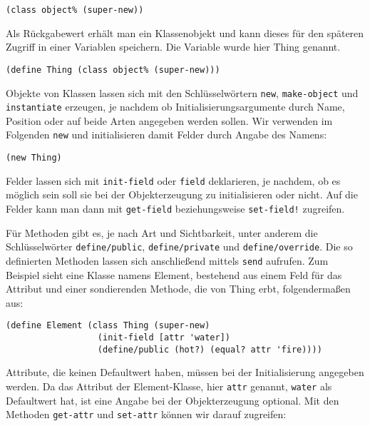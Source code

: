 \begin{lstlisting}
(class object% (super-new))
\end{lstlisting}

Als Rückgabewert erhält man ein Klassenobjekt und kann dieses für den späteren Zugriff in einer Variablen speichern. Die Variable wurde hier Thing genannt.

\begin{lstlisting}
(define Thing (class object% (super-new)))
\end{lstlisting}

Objekte von Klassen lassen sich mit den Schlüsselwörtern \texttt{new}, \texttt{make-object} und \texttt{instantiate} erzeugen, je nachdem ob Initialisierungsargumente durch Name, Position oder auf beide Arten angegeben werden sollen. Wir verwenden im Folgenden \texttt{new} und initialisieren damit Felder durch Angabe des Namens:

\begin{lstlisting}
(new Thing)
\end{lstlisting}

Felder lassen sich mit \texttt{init-field} oder \texttt{field} deklarieren, je nachdem, ob es möglich sein soll sie bei der Objekterzeugung zu initialisieren oder nicht. Auf die Felder kann man dann mit \texttt{get-field} beziehungsweise \texttt{set-field!} zugreifen. 

Für Methoden gibt es, je nach Art und Sichtbarkeit, unter anderem die Schlüsselwörter \texttt{define/public}, \texttt{define/private} und \texttt{define/override}. Die so definierten Methoden lassen sich anschließend mittels \texttt{send} aufrufen. Zum Beispiel sieht eine Klasse namens Element, bestehend aus einem Feld für das Attribut und einer sondierenden Methode, die von Thing erbt, folgendermaßen aus:

\begin{lstlisting}
(define Element (class Thing (super-new)
                  (init-field [attr 'water])
                  (define/public (hot?) (equal? attr 'fire))))
\end{lstlisting}

Attribute, die keinen Defaultwert haben, müssen bei der Initialisierung angegeben werden. Da das Attribut der Element-Klasse, hier \texttt{attr} genannt, \texttt{{\textquotesingle}water} als Defaultwert hat, ist eine Angabe bei der Objekterzeugung optional. Mit den Methoden \texttt{get-attr} und \texttt{set-attr} können wir darauf zugreifen:


